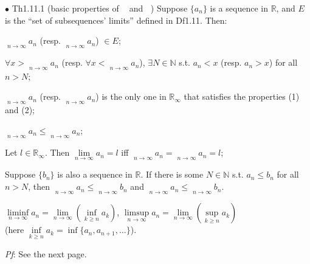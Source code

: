 \documentclass{article}
\begin{document}
\begin{Th}{$\bullet$ Th1.11.1 (basic properties of $\mathop{\overline{\lim}}$ and $\mathop{\underline{\lim}}$)}
    Suppose $\{a_n\}$ is a sequence in $\mathbb{R}$, and $E$ is the ``set of subsequences' limits'' defined in Df1.11. Then:
    \begin{compactenum}
        \item $\mathop{\overline{\lim}}\limits_{n\to\infty}a_n$ (resp. $\mathop{\underline{\lim}}\limits_{n\to\infty}a_n$) $\in E$;
        \item $\forall x>\mathop{\overline{\lim}}\limits_{n\to\infty}a_n$ (resp. $\forall x<\mathop{\underline{\lim}}\limits_{n\to\infty}a_n$), $\exists N\in\mathbb{N}$ s.t. $a_n<x$ (resp. $a_n>x$) for all $n>N$;
        \item $\mathop{\overline{\lim}}\limits_{n\to\infty}a_n$ (resp. $\mathop{\underline{\lim}}\limits_{n\to\infty}a_n$) is the only one in $\mathbb{R}_\infty$ that satisfies the properties (1) and (2);
        \item $\mathop{\underline{\lim}}\limits_{n\to\infty}a_n \leq \mathop{\overline{\lim}}\limits_{n\to\infty}a_n$;
        \item Let $l\in\mathbb{R}_\infty$. Then $\lim\limits_{n\to\infty}a_n=l$ iff $\mathop{\overline{\lim}}\limits_{n\to\infty}a_n=\mathop{\underline{\lim}}\limits_{n\to\infty}a_n=l$;
        \item Suppose $\{b_n\}$ is also a sequence in $\mathbb{R}$. If there is some $N\in\mathbb{N}$ s.t. $a_n\leq b_n$ for all $n>N$, then $\mathop{\underline{\lim}}\limits_{n\to\infty}a_n\leq \mathop{\underline{\lim}}\limits_{n\to\infty}b_n$ and $\mathop{\overline{\lim}}\limits_{n\to\infty}a_n\leq \mathop{\overline{\lim}}\limits_{n\to\infty}b_n$.
        \item $\liminf\limits_{n\to\infty}a_n = \lim\limits_{n\to\infty}\left(\inf\limits_{k\geq n}a_k\right)$, $\limsup\limits_{n\to\infty}a_n = \lim\limits_{n\to\infty}\left(\sup\limits_{k\geq n}a_k\right)$ \\
        (here $\inf\limits_{k\geq n}a_k = \inf\{a_n, a_{n+1}, \dots\}$).
    \end{compactenum}
    \tcblower
    \textit{Pf}: See the next page.
\end{Th}
\end{document}
